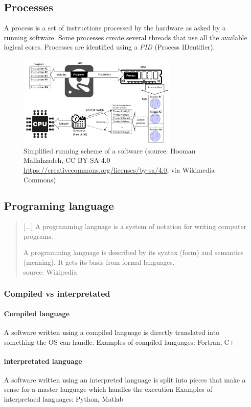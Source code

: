 \documentclass[11pt]{article}
\begin{document}
		\subsection{Processes}
			A process is a set of instructions processed by the hardware as asked by a running software.
			Some processes create several threads that use all the available logical cores. Processes are identified using a
			 \textit{PID} (Process IDentifier).
			\begin{figure}[!h]
				\begin{center}
					\includegraphics[width=300px]{figures/process.jpg}
					\caption{Simplified running scheme of a software \newline
					\scriptsize{(source: Hooman Mallahzadeh, CC BY-SA 4.0
					\url{https://creativecommons.org/licenses/by-sa/4.0}, via Wikimedia Commons})}
				\end{center}
			\end{figure}

		\subsection{Programing language}
			\begin{quotation}
			[...]
			A programming language is a system of notation for writing computer programs.
			
			A programming language is described by its syntax (form) and semantics (meaning). 
			It gets its basis from formal languages.\\
				\scriptsize{source: Wikipedia}
			\end{quotation}

			\subsubsection{Compiled vs interpretated}

				\paragraph{Compiled language}
					A software written using a compiled language is directly translated into something the OS can handle.
					Examples of compiled languages: Fortran, C++

				\paragraph{interpretated language}
					A software written using an interpreted language is split into pieces
					that make a sense for a master language which handles the execution
					Examples of interpretaed languages: Python, Matlab
\end{document}
